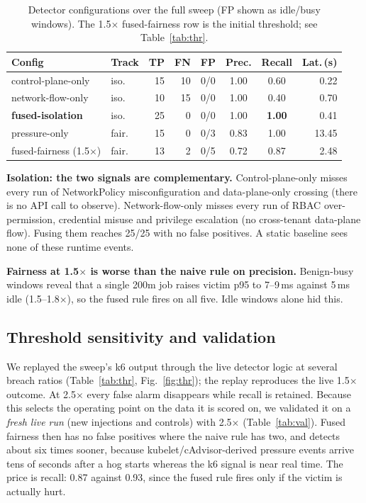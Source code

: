 \documentclass[conference]{IEEEtran}
\begin{document}
\begin{table}[t]
\caption{Detector configurations over the full sweep (FP shown as idle/busy windows). The 1.5$\times$ fused-fairness row is the initial threshold; see Table~\ref{tab:thr}.}
\label{tab:main}
\centering
\setlength{\tabcolsep}{3pt}
\begin{tabular}{llrrcccr}
\toprule
Config & Track & TP & FN & FP & Prec. & Recall & Lat.\,(s)\\
\midrule
control-plane-only & iso. & 15 & 10 & 0/0 & 1.00 & 0.60 & 0.22\\
network-flow-only & iso. & 10 & 15 & 0/0 & 1.00 & 0.40 & 0.70\\
\textbf{fused-isolation} & iso. & 25 & 0 & 0/0 & 1.00 & \textbf{1.00} & 0.41\\
\midrule
pressure-only & fair. & 15 & 0 & 0/3 & 0.83 & 1.00 & 13.45\\
fused-fairness (1.5$\times$) & fair. & 13 & 2 & 0/5 & 0.72 & 0.87 & 2.48\\
\bottomrule
\end{tabular}
\end{table}

\textbf{Isolation: the two signals are complementary.} Control-plane-only misses every run of NetworkPolicy misconfiguration and data-plane-only crossing (there is no API call to observe). Network-flow-only misses every run of RBAC over-permission, credential misuse and privilege escalation (no cross-tenant data-plane flow). Fusing them reaches 25/25 with no false positives. A static baseline sees none of these runtime events.

\textbf{Fairness at 1.5$\times$ is worse than the naive rule on precision.} Benign-busy windows reveal that a single 200m job raises victim p95 to 7--9\,ms against 5\,ms idle (1.5--1.8$\times$), so the fused rule fires on all five. Idle windows alone hid this.

\subsection{Threshold sensitivity and validation}
We replayed the sweep's k6 output through the live detector logic at several breach ratios (Table~\ref{tab:thr}, Fig.~\ref{fig:thr}); the replay reproduces the live 1.5$\times$ outcome. At 2.5$\times$ every false alarm disappears while recall is retained. Because this selects the operating point on the data it is scored on, we validated it on a \emph{fresh live run} (new injections and controls) with 2.5$\times$ (Table~\ref{tab:val}). Fused fairness then has no false positives where the naive rule has two, and detects about six times sooner, because kubelet/cAdvisor-derived pressure events arrive tens of seconds after a hog starts whereas the k6 signal is near real time. The price is recall: 0.87 against 0.93, since the fused rule fires only if the victim is actually hurt.
\end{document}
